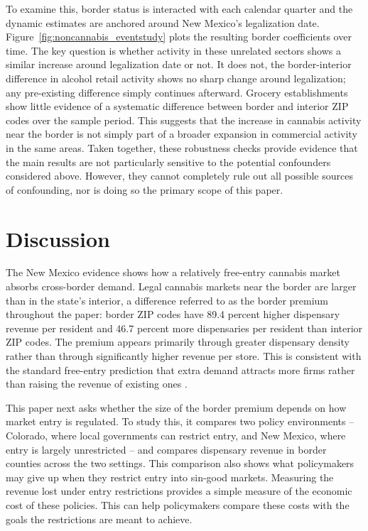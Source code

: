 \documentclass[12pt]{article}
\begin{document}
To examine this, border status is interacted with each calendar quarter and the dynamic estimates are anchored around New Mexico's legalization date. Figure~\ref{fig:noncannabis_eventstudy} plots the resulting border coefficients over time. The key question is whether activity in these unrelated sectors shows a similar increase around legalization date or not. It does not, the border-interior difference in alcohol retail activity shows no sharp change around legalization; any pre-existing difference simply continues afterward. Grocery establishments show little evidence of a systematic difference between border and interior ZIP codes over the sample period. This suggests that the increase in cannabis activity near the border is not simply part of a broader expansion in commercial activity in the same areas. 
Taken together, these robustness checks provide evidence that the main results are not particularly sensitive to the potential confounders considered above. However, they cannot completely rule out all possible sources of confounding, nor is doing so the primary scope of this paper.



\section{Discussion}
\label{sec:discussion}

The New Mexico evidence shows how a relatively free-entry cannabis market absorbs cross-border demand. Legal cannabis markets near the border are larger than in the state's interior, a difference referred to as the border premium throughout the paper: border ZIP codes have 89.4 percent higher dispensary revenue per resident and 46.7 percent more dispensaries per resident than interior ZIP codes. The premium appears primarily through greater dispensary density rather than through significantly higher revenue per store. This is consistent with the standard free-entry prediction that extra demand attracts more firms rather than raising the revenue of existing ones \citep{BresnahanReiss1991}.

This paper next asks whether the size of the border premium depends on how market entry is regulated. To study this, it compares two policy environments -- Colorado, where local governments can restrict entry, and New Mexico, where entry is largely unrestricted -- and compares dispensary revenue in border counties across the two settings. This comparison also shows what policymakers may give up when they restrict entry into sin-good markets. Measuring the revenue lost under entry restrictions provides a simple measure of the economic cost of these policies. This can help policymakers compare these costs with the goals the restrictions are meant to achieve.
\end{document}
